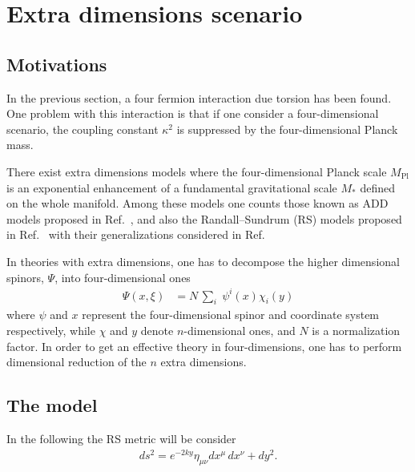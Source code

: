 \section{Extra dimensions scenario}
\subsection{Motivations}

In the previous section, a four fermion interaction due torsion has been found. One  problem with this interaction is that if one consider a four-dimensional scenario, the coupling constant $\kappa^2$ is suppressed by the four-dimensional Planck mass. 

There exist extra dimensions models where the four-dimensional Planck scale $M_{\text{Pl}}$ is an exponential enhancement of  a fundamental gravitational scale $M_*$ defined on the whole manifold. Among these models one counts those known as %
ADD models proposed  in Ref.~\cite{ArkaniHamed:1998rs,Antoniadis:1998ig,ArkaniHamed:1998nn}, %
and also the  Randall--Sundrum (RS) models proposed in Ref.~\cite{Randall:1999ee,Randall:1999vf} %
with their generalizations  considered in Ref.~\cite{DeWolfe:1999cp,Gremm:1999pj,MPS,CastilloFelisola:2004eg}

In theories  with extra dimensions, one has to decompose the higher dimensional spinors, $\Psi$, into four-dimensional ones 
\begin{align}
  \label{spinordecomp}
  \Psi(x,\xi) &= N\,\sum_{i}\; \psi^{i}(x)\chi_{i}(y)
\end{align}
where $\psi$ and $x$ represent the four-dimensional spinor and coordinate system respectively, while $\chi$ and $y$ denote  $n$-dimensional ones, and $N$ is a normalization factor. In order to get an effective theory in four-dimensions, one has to perform dimensional reduction of the $n$ extra dimensions.

\subsection{The model}
In the following the  RS metric  will be consider~\cite{Randall:1999ee}
\begin{align}
  \label{RSmetric}
  ds^2 = e^{-2ky}\eta_{\mu\nu}dx^\mu\,dx^\nu + dy^2.
\end{align}

